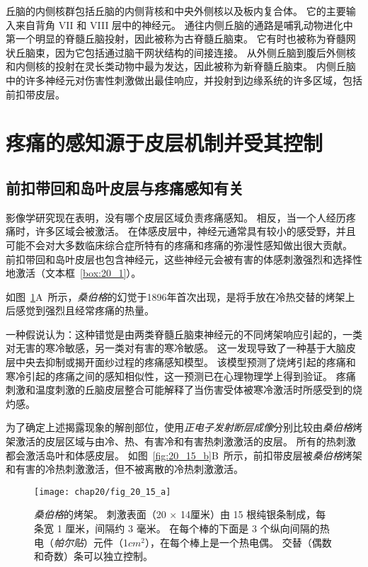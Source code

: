 丘脑的内侧核群包括丘脑的内侧背核和中央外侧核以及板内复合体。
它的主要输入来自背角 VII 和 VIII 层中的神经元。 
通往内侧丘脑的通路是哺乳动物进化中第一个明显的脊髓丘脑投射，因此被称为古脊髓丘脑束。
它有时也被称为脊髓网状丘脑束，因为它包括通过脑干网状结构的间接连接。
从外侧丘脑到腹后外侧核和内侧核的投射在灵长类动物中最为发达，因此被称为新脊髓丘脑束。
内侧丘脑中的许多神经元对伤害性刺激做出最佳响应，并投射到边缘系统的许多区域，包括前扣带皮层。



\section{疼痛的感知源于皮层机制并受其控制}

\subsection{前扣带回和岛叶皮层与疼痛感知有关}

影像学研究现在表明，没有哪个皮层区域负责疼痛感知。 
相反，当一个人经历疼痛时，许多区域会被激活。
在体感皮层中，神经元通常具有较小的感受野，并且可能不会对大多数临床综合症所特有的疼痛和疼痛的弥漫性感知做出很大贡献。
前扣带回和岛叶皮层也包含神经元，这些神经元会被有害的体感刺激强烈和选择性地激活（文本框~\ref{box:20_1}）。


\begin{proposition}[大脑皮层幻觉疼痛的定位] \label{box:20_1}
	
	\quad \quad 如图~\ref{fig:20_15_a}A~所示，\textit{桑伯格}的幻觉于1896年首次出现，是将手放在冷热交替的烤架上后感觉到强烈且经常疼痛的热量。
	
	\quad \quad 一种假说认为：这种错觉是由两类脊髓丘脑束神经元的不同烤架响应引起的，一类对无害的寒冷敏感，另一类对有害的寒冷敏感。
	这一发现导致了一种基于大脑皮层中央去抑制或揭开面纱过程的疼痛感知模型。
	该模型预测了烧烤引起的疼痛和寒冷引起的疼痛之间的感知相似性，这一预测已在心理物理学上得到验证。
	疼痛刺激和温度刺激的丘脑皮层整合可能解释了当伤害受体被寒冷激活时所感受到的烧灼感。
	
	\quad \quad 为了确定上述揭露现象的解剖部位，使用\textit{正电子发射断层成像}分别比较由\textit{桑伯格}烤架激活的皮层区域与由冷、热、有害冷和有害热刺激激活的皮层。
	所有的热刺激都会激活岛叶和体感皮层。
	如图~\ref{fig:20_15_b}B~所示，前扣带皮层被\textit{桑伯格}烤架和有害的冷热刺激激活，但不被离散的冷热刺激激活。
	
\end{proposition}


\begin{figure}[htbp]
	\centering
	\texttt{[image: chap20/fig\_20\_15\_a]}
	\caption{\textit{桑伯格}的烤架。
		刺激表面（20 $\times$ 14厘米）由 15 根纯银条制成，每条宽 1 厘米，间隔约 3 毫米。
		在每个棒的下面是 3 个纵向间隔的热电（\textit{帕尔贴}）元件（1$ cm^2 $），在每个棒上是一个热电偶。
		交替（偶数和奇数）条可以独立控制\cite{craig1994thermal}。}
	\label{fig:20_15_a}
\end{figure}



